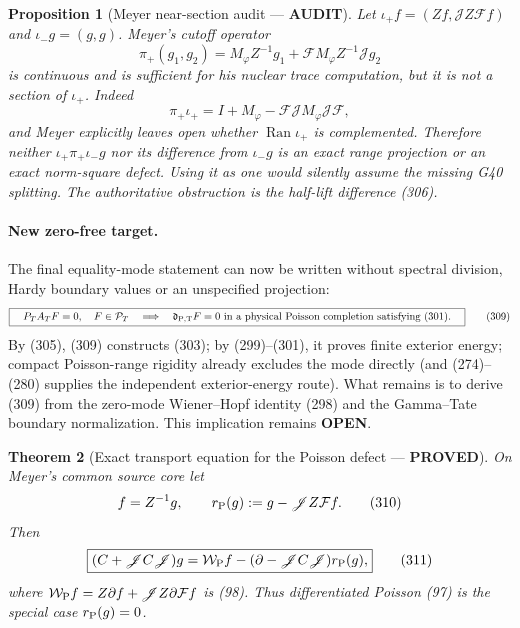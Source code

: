 \documentclass[11pt]{article}
\newtheorem{theorem}{Theorem}
\newtheorem{proposition}[theorem]{Proposition}
\newcommand{\PROVED}{\textcolor{green!45!black}{\textbf{PROVED}}}
\newcommand{\OPEN}{\textcolor{red!70!black}{\textbf{OPEN}}}
\newcommand{\AUDIT}{\textcolor{orange!75!black}{\textbf{AUDIT}}}
\begin{document}
\begin{proposition}[Meyer near-section audit --- \AUDIT]
Let $\iota_+f=(Zf,\mathscr JZ\mathcal Ff)$ and
$\iota_-g=(g,g)$.  Meyer's cutoff operator
\begin{equation}
 \pi_+(g_1,g_2)=M_\varphi Z^{-1}g_1
  +\mathcal F M_\varphi Z^{-1}\mathscr Jg_2          \tag{307}
\end{equation}
is continuous and is sufficient for his nuclear trace computation, but it
is not a section of $\iota_+$.  Indeed
\begin{equation}
 \pi_+\iota_+
 =I+M_\varphi-\mathcal F\mathscr JM_\varphi
                  \mathscr J\mathcal F,              \tag{308}
\end{equation}
and Meyer explicitly leaves open whether $\operatorname{Ran}\iota_+$ is
complemented.  Therefore neither
$\iota_+\pi_+\iota_-g$ nor its difference from $\iota_-g$ is an exact range
projection or an exact norm-square defect.  Using it as one would silently
assume the missing G40 splitting.  The authoritative obstruction is the
half-lift difference (306).
\end{proposition}

\paragraph{New zero-free target.}
The final equality-mode statement can now be written without spectral
division, Hardy boundary values or an unspecified projection:
\begin{equation}
 \boxed{\quad
 P_TA_TF=0,\quad F\in\mathcal P_T
 \quad\Longrightarrow\quad
 \mathfrak d_{\rm P,T}F=0
 \ \hbox{in a physical Poisson completion satisfying (301).}\quad}
                                                               \tag{309}
\end{equation}
By (305), (309) constructs (303); by (299)--(301), it proves finite exterior
energy; compact Poisson-range rigidity already excludes the mode directly
(and (274)--(280) supplies the independent exterior-energy route).  What
remains is to derive (309) from the zero-mode Wiener--Hopf identity (298) and
the Gamma--Tate boundary normalization.  This implication remains \OPEN{}.

\begin{theorem}[Exact transport equation for the Poisson defect --- \PROVED]
On Meyer's common source core let
\begin{equation}
 f=Z^{-1}g,\qquad
 r_{\rm P}(g):=g-\mathscr JZ\mathcal Ff.              \tag{310}
\end{equation}
Then
\begin{equation}
 \boxed{
 (C+\mathscr JC\mathscr J)g
 =\mathcal W_{\rm P}f
  -(\partial-\mathscr JC\mathscr J)r_{\rm P}(g),}     \tag{311}
\end{equation}
where
$\mathcal W_{\rm P}f=Z\partial f+\mathscr JZ\partial\mathcal Ff$
is (98).  Thus differentiated Poisson (97) is the special case
$r_{\rm P}(g)=0$.
\end{theorem}
\end{document}
